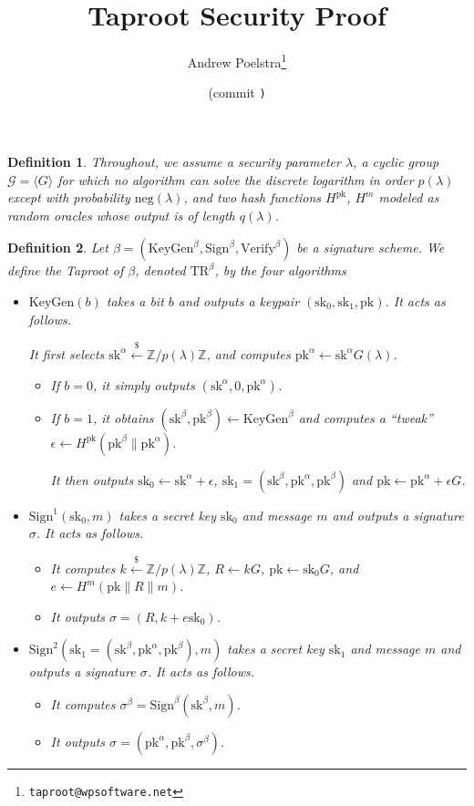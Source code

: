 \documentclass[letterpaper]{article}
\title{Taproot Security Proof}
\author{Andrew Poelstra\footnote{\texttt{taproot@wpsoftware.net}}}
\date{\gitAuthorDate{} (commit \texttt{\gitAbbrevHash)}}
\newtheorem{defn}{Definition}
\newcommand{\TR}[1]{\mathrm{TR}^{#1}}
\newcommand{\KeyGen}{\mathrm{KeyGen}}
\newcommand{\Sign}{\mathrm{Sign}}
\newcommand{\Verify}{\mathrm{Verify}}
\newcommand{\sk}{\mathrm{sk}}
\newcommand{\pk}{\mathrm{pk}}
\newcommand{\negl}{\mathrm{neg}}
\newcommand{\randgets}{\xleftarrow{\$}}
\begin{document}
\maketitle

\modulolinenumbers[10]

\begin{defn} Throughout, we assume a security parameter $\lambda$, a
cyclic group $\mathcal{G} = \langle G\rangle$ for which no algorithm can solve the
discrete logarithm in order $p(\lambda)$ except with probability
$\negl(\lambda)$, and two hash functions $H^\pk$, $H^m$ modeled as
random oracles whose output is of length $q(\lambda)$.\end{defn}

\begin{defn} Let $\beta = (\KeyGen^\beta, \Sign^\beta, \Verify^\beta)$ be a
signature scheme. We define the \emph{Taproot} of
$\beta$, denoted $\TR{\beta}$, by the four algorithms

\begin{itemize}
\item $\KeyGen(b)$ takes a bit $b$ and outputs a keypair
$(\sk_0, \sk_1, \pk)$. It acts as follows.

It first selects $\sk^\alpha\randgets\mathbb{Z}/p(\lambda)\mathbb{Z}$,
and computes $\pk^\alpha\gets\sk^\alpha G(\lambda)$.

\begin{itemize}
\item If $b=0$, it simply outputs $(\sk^\alpha, 0, \pk^\alpha)$.
\item If $b=1$, it obtains $(\sk^\beta, \pk^\beta) \gets \KeyGen^\beta$ and computes
a ``tweak'' $\epsilon\gets H^\pk(\pk^\beta\|\pk^\alpha)$.

It then outputs $\sk_0\gets\sk^\alpha+\epsilon$, $\sk_1=(\sk^\beta, \pk^\alpha, \pk^\beta)$ and
$\pk\gets\pk^\alpha+\epsilon G$.
\end{itemize}

\item $\Sign^1(\sk_0, m)$ takes a secret key $\sk_0$ and message $m$ and outputs
a signature $\sigma$. It acts as follows.
\begin{itemize}
\item It computes $k\randgets\mathbb{Z}/p(\lambda)\mathbb{Z}$, $R\gets kG$, $\pk\gets
\sk_0G$, and $e\gets H^m(\pk\|R\|m)$.
\item It outputs $\sigma = (R, k + e\sk_0)$.
\end{itemize}

\item $\Sign^2(\sk_1 = (\sk^\beta, \pk^\alpha, \pk^\beta), m)$ takes a secret key $\sk_1$ and
message $m$ and outputs a signature $\sigma$. It acts as follows.
\begin{itemize}
\item It computes $\sigma^\beta = \Sign^\beta(\sk^\beta, m)$.
\item It outputs $\sigma = (\pk^\alpha, \pk^\beta, \sigma^\beta)$.
\end{itemize}



\end{itemize}
\end{defn}
\end{document}
